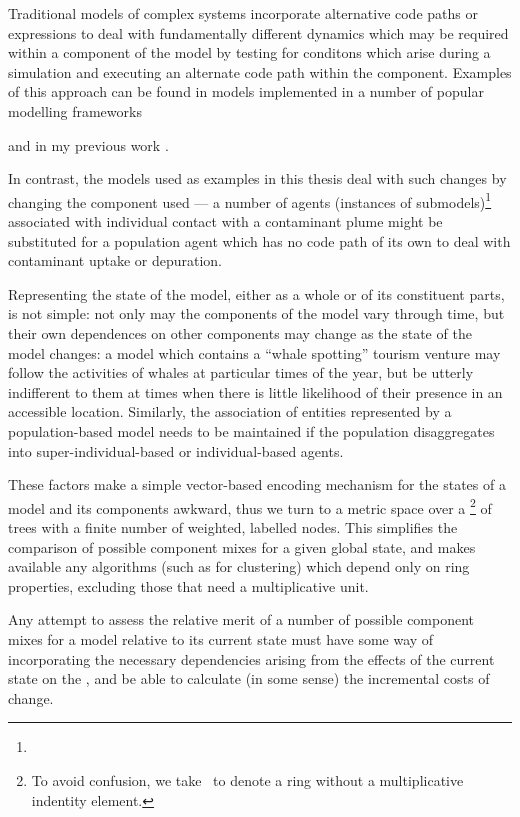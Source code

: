 Traditional models of complex systems incorporate alternative code
paths or expressions to deal with fundamentally different dynamics
which may be required within a component of the model by testing for
conditons which arise during a simulation and executing an alternate
code path within the component. Examples of this approach can be found
in models implemented in a number of popular modelling frameworks
{\citep{netlogo,swarm,repast,mason} and in my previous work
  \citep{nws,ningaloo}.

In contrast, the models used as examples in this thesis deal with such
changes by changing the component used --- a number of agents
(instances of submodels)\footnote{} associated with individual contact
with a contaminant plume might be substituted for a population agent
which has no code path of its own to deal with contaminant uptake or
depuration.

Representing the state of the model, either as a whole or of its
constituent parts, is not simple: not only may the components of the
model vary through time, but their own dependences on other components
may change as the state of the model changes: a model which contains a
``whale spotting'' tourism venture may follow the activities of whales
at particular times of the year, but be utterly indifferent to them at
times when there is little likelihood of their presence in an
accessible location. Similarly, the association of entities
represented by a population-based model needs to be maintained if the
population disaggregates into super-individual-based or
individual-based agents.

These factors make a simple vector-based encoding mechanism for the
states of a model and its components awkward, thus we turn to a metric
space over a \rng\footnote{To avoid confusion, we take \rng\ to denote
  a ring without a multiplicative indentity element.} of trees with a
finite number of weighted, labelled nodes. This simplifies the
comparison of possible component mixes for a given global state, and
makes available any algorithms (such as for clustering) which depend
only on ring properties, excluding those that need a multiplicative
unit.

Any attempt to assess the relative merit of a number of possible
component mixes for a model relative to its current state must have
some way of incorporating the necessary dependencies arising from the
effects of the current state on the , and be able to calculate (in
some sense) the incremental costs of change.


}
